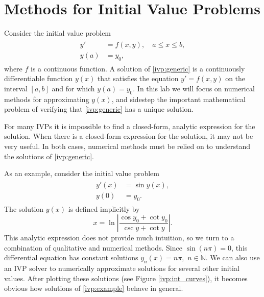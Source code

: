 \label{lab:ivp}


\section*{Methods for Initial Value Problems}
Consider the initial value problem
\begin{align}
	\begin{split}
y' &= f(x,y),\quad a \leq x \leq b, \\
y(a) &= y_0, 
	\end{split}\label{ivp:generic}
\end{align}
where $f$ is a continuous function. 
A solution of \eqref{ivp:generic} is a continuously differentiable function $y(x)$ that satisfies the equation $y' = f(x,y)$ on the interval $[a,b]$ and for which $y(a) = y_0$. 
In this lab we will focus on numerical methods for approximating $y(x)$, and sidestep the important mathematical problem of verifying that \eqref{ivp:generic} has a unique solution.

For many IVPs it is impossible to find a closed-form, analytic expression for the solution.
When there is a closed-form expression for the solution, it may not be very useful.
In both cases, numerical methods must be relied on to understand the solutions of \eqref{ivp:generic}. 

As an example, consider the initial value problem
\begin{align}
	\begin{split}
y'(x) &= \sin y(x), \\
y(0) &= y_0.
	\end{split}\label{ivp:example}
\end{align}
The solution $y(x)$ is defined implicitly by
\[x = \ln \left|\frac{\cos y_0 + \cot y_0}{\csc y + \cot y} \right|.\]
This analytic expression does not provide much intuition, so we turn to a combination of qualitative and numerical methods. 
Since $\sin (n \pi) = 0$, this differential equation has constant solutions $y_n(x) = n \pi,$ $n \in \mathbb{N}$. 
We can also use an IVP solver to numerically approximate solutions for several other initial values. 
After plotting these solutions (see Figure \ref{ivp:int_curves}), it becomes obvious how solutions of \eqref{ivp:example} behave in general.

